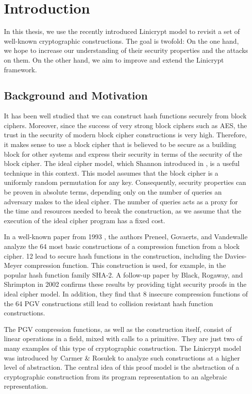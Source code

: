 \chapter{Introduction}

In this thesis, we use the recently introduced Linicrypt model to revisit a set of well-known cryptographic constructions.
The goal is twofold:
On the one hand, we hope to increase our understanding of their security properties and the attacks on them.
On the other hand, we aim to improve and extend the Linicrypt framework.

\section{Background and Motivation}

It has been well studied that we can construct hash functions securely from block ciphers.
Moreover, since the success of very strong block ciphers such as AES, 
the trust in the security of modern block cipher constructions is very high.
Therefore, it makes sense to use a block cipher that is believed to be secure as a building block for other systems
and express their security in terms of the security of the block cipher.
The ideal cipher model, which Shannon introduced in \cite{Shannon49},
is a useful technique in this context.
This model assumes that the block cipher is a uniformly random permutation for any key.
Consequently, security properties can be proven in absolute terms, depending only on the number of queries an adversary makes to the ideal cipher.
The number of queries acts as a proxy for the time and resources needed to break the construction,
as we assume that the execution of the ideal cipher program has a fixed cost.

In a well-known paper from 1993 \cite{C:PreGovVan93}, the authors Preneel, Govaerts, and Vandewalle analyze the 64 most basic constructions of a compression function from a block cipher.
12 lead to secure hash functions in the \MD construction, including the Davies-Meyer compression function.
This construction is used, for example, in the popular hash function family SHA-2.
A follow-up paper by Black, Rogaway, and Shrimpton \cite{C:BlaRogShr02} in 2002 confirms these results
by providing tight security proofs in the ideal cipher model.
In addition, 
they find that 8 insecure compression functions of the 64 PGV constructions still lead to collision resistant \MD hash function constructions.

The PGV compression functions, as well as the \MD construction itself, consist of linear operations in a field,
mixed with calls to a primitive.
They are just two of many examples of this type of cryptographic construction.
The Linicrypt model was introduced by Carmer \& Rosulek \cite{C:CarRos16} to analyze such constructions at a higher level of abstraction.
The central idea of this proof model is the abstraction of a cryptographic construction from its program representation to an algebraic representation.

